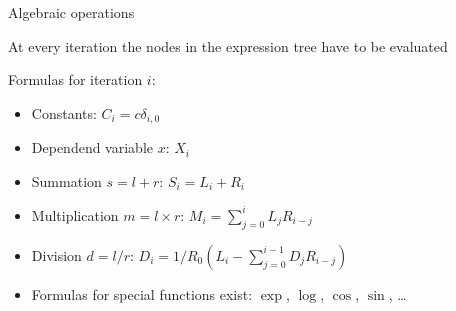 \documentclass{beamer}
\begin{document}
\begin{frame}[fragile]{Algebraic operations}

At every iteration the nodes in the expression tree have to be evaluated

\vspace{2ex}
Formulas for iteration $i$:

\begin{itemize}
 \item Constants: $C_i = c \delta_{i,0}$
 \item Dependend variable $x$: $X_i$
 \item Summation $s=l+r$: $S_i = L_i + R_i$
 \item Multiplication $m=l \times r$: $M_i = \sum\limits_{j=0}^i L_j R_{i-j}$
 \item Division $d=l/r$: $D_i = 1 / R_0 ( L_i - \sum\limits_{j=0}^{i-1} D_j R_{i-j} )$
 \item Formulas for special functions exist: $\exp$, $\log$, $\cos$, $\sin$, \dots
\end{itemize}

\end{frame}
\end{document}
